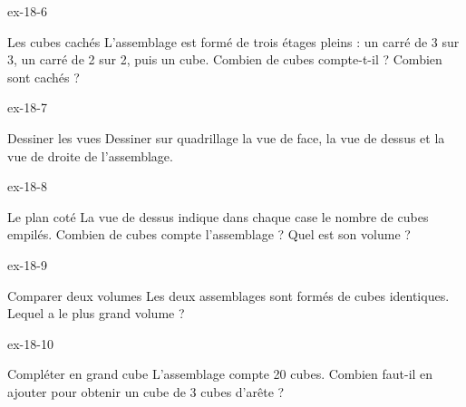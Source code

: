 \begin{blocLivre}{ex-18-6}\begin{exercice}[2]{Les cubes cachés}
L’assemblage est formé de trois étages pleins : un carré de 3 sur 3, un carré de 2 sur 2, puis un cube. Combien de cubes compte-t-il ? Combien sont cachés ?
\label{fig-ex-18-6}
\end{exercice}\end{blocLivre}
\begin{blocLivre}{ex-18-7}\begin{exercice}[2]{Dessiner les vues}
Dessiner sur quadrillage la vue de face, la vue de dessus et la vue de droite de l’assemblage.
\label{fig-ex-18-7}
\end{exercice}\end{blocLivre}
\begin{blocLivre}{ex-18-8}\begin{exercice}[2]{Le plan coté}
La vue de dessus indique dans chaque case le nombre de cubes empilés. Combien de cubes compte l’assemblage ? Quel est son volume ?
\label{fig-ex-18-8}
\end{exercice}\end{blocLivre}
\begin{blocLivre}{ex-18-9}\begin{exercice}[2]{Comparer deux volumes}
Les deux assemblages sont formés de cubes identiques. Lequel a le plus grand volume ?
\label{fig-ex-18-9}
\end{exercice}\end{blocLivre}
\begin{blocLivre}{ex-18-10}\begin{exercice}[2]{Compléter en grand cube}
L’assemblage compte 20 cubes. Combien faut-il en ajouter pour obtenir un cube de 3 cubes d’arête ?
\label{fig-ex-18-10}
\end{exercice}\end{blocLivre}

